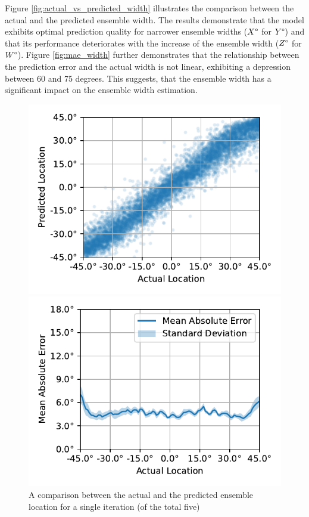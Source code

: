 \documentclass{article}
\begin{document}
Figure \ref{fig:actual_vs_predicted_width} illustrates the comparison between the actual and the predicted ensemble width. The results demonstrate that the model exhibits optimal prediction quality for narrower ensemble widths ($X\degree$ for $Y\degree$) and that its performance deteriorates with the increase of the ensemble width ($Z\degree$ for $W\degree$). Figure \ref{fig:mae_width} further demonstrates that the relationship between the prediction error and the actual width is not linear, exhibiting a depression between 60 and 75 degrees. This suggests, that the ensemble width has a significant impact on the ensemble width estimation.

\begin{figure}[ht]
  \centering
  \begin{minipage}[t]{0.45\linewidth}
    \includegraphics[width=\linewidth]{../figures/actual_vs_predicted_location.pdf}
    \caption{\label{fig:actual_vs_predicted_location}A comparison between the actual and the predicted ensemble location for a single iteration (of the total five) }
  \end{minipage}
  \hspace{0.5cm} 
  \begin{minipage}[t]{0.45\linewidth}
    \includegraphics[width=\linewidth]{../figures/mae_location.pdf}

\end{minipage}
\end{figure}
\end{document}
